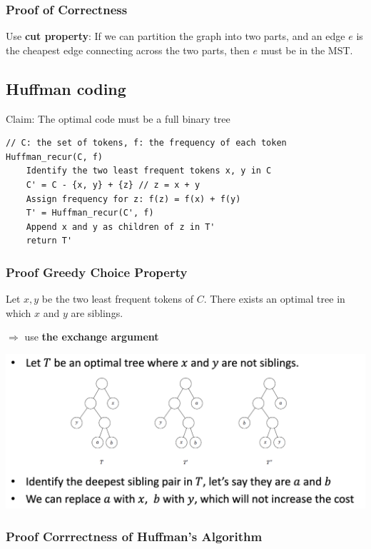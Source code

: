 \documentclass[12pt,a4paper]{article}
\begin{document}
\subsubsection{Proof of Correctness}

Use \textbf{cut property}: If we can partition the graph into two parts, 
and an edge $e$ is the cheapest edge connecting across the two parts, then $e$ must be in the MST.

\subsection*{Huffman coding}

Claim: The optimal code must be a full binary tree

\begin{verbatim}
// C: the set of tokens, f: the frequency of each token
Huffman_recur(C, f)
    Identify the two least frequent tokens x, y in C
    C' = C - {x, y} + {z} // z = x + y
    Assign frequency for z: f(z) = f(x) + f(y)
    T' = Huffman_recur(C', f)
    Append x and y as children of z in T'
    return T'
\end{verbatim}

\subsubsection*{Proof Greedy Choice Property}

Let $x,y$ be the two least frequent tokens of $C$.
There exists an optimal tree in which $x$ and $y$ are siblings.

\(\Rightarrow\) use \textbf{the exchange argument}

\includegraphics[width=\textwidth]{./images/the_exchange_argument.png}

\subsubsection*{Proof Corrrectness of Huffman's Algorithm}
\end{document}

